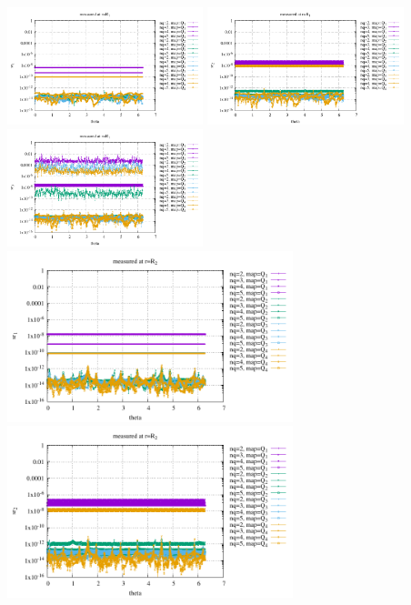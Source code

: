 \begin{center}
\includegraphics[width=5.7cm]{python_codes/fieldstone_152/results/exp1/sr1_R1}
\includegraphics[width=5.7cm]{python_codes/fieldstone_152/results/exp1/sr2_R1}
\includegraphics[width=5.7cm]{python_codes/fieldstone_152/results/exp1/sr3_R1}\\
\includegraphics[width=8.3cm]{python_codes/fieldstone_152/results/exp1/sr1_R2}
\includegraphics[width=8.3cm]{python_codes/fieldstone_152/results/exp1/sr2_R2}\\

\end{center}
